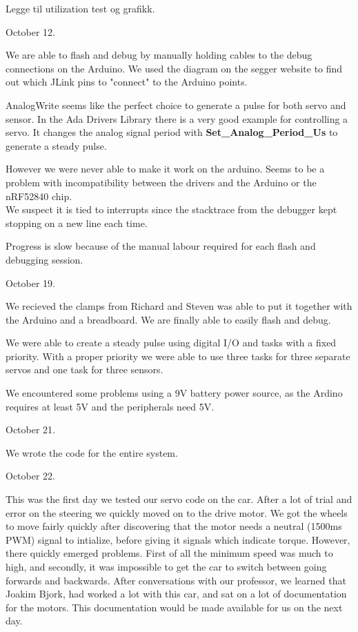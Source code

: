 \documentclass{article}
\begin{document}
Legge til utilization test og grafikk.
\vspace{5mm}

October 12. 

We are able to flash and debug by manually holding cables to the debug connections on the Arduino. We used the diagram on the segger website \cite{JLINK} to find out which JLink pins to "connect" to the Arduino points.

AnalogWrite seems like the perfect choice to generate a pulse for both servo and sensor. In the Ada Drivers Library \cite{ADADRIVERSLIBRARY} there is a very good example for controlling a servo. It changes the analog signal period with \textbf{Set\_Analog\_Period\_Us} to generate a steady pulse.

However we were never able to make it work on the arduino. Seems to be a problem with incompatibility between the drivers and the Arduino or the nRF52840 chip.\\
We suspect it is tied to interrupts since the stacktrace from the debugger kept stopping on a new line each time.

Progress is slow because of the manual labour required for each flash and debugging session.
\vspace{5mm}

October 19. 

We recieved the clamps from Richard and Steven was able to put it together with the Arduino and a breadboard. We are finally able to easily flash and debug.

We were able to create a steady pulse using digital I/O and tasks with a fixed priority. With a proper priority we were able to use three tasks for three separate servos and one task for three sensors.

We encountered some problems using a 9V battery power source, as the Ardino requires at least 5V and the peripherals need 5V.


\vspace{5mm}
October 21.

We wrote the code for the entire system.


\vspace{5mm}
October 22.

This was the first day we tested our servo code on the car. After a lot of trial and error on the steering we quickly moved on to the drive motor. We got the wheels to move fairly quickly after discovering that the motor needs a neutral (1500ms PWM) signal to intialize, before giving it signals which indicate torque. However, there quickly emerged problems. First of all the minimum speed was much to high, and secondly, it was impossible to get the car to switch between going forwards and backwards. After conversations with our professor, we learned that Joakim Bjork, had worked a lot with this car, and sat on a lot of documentation for the motors. This documentation would be made available for us on the next day.
\end{document}
